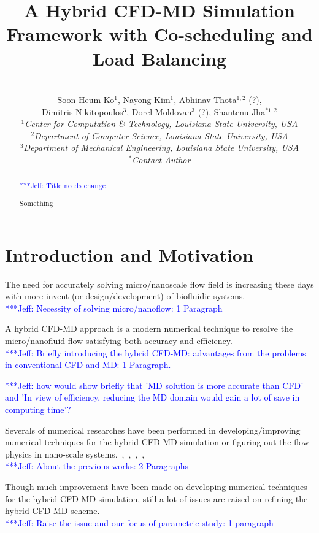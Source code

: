 \documentclass[conference,final]{IEEEtran}
\title{A Hybrid CFD-MD Simulation Framework with Co-scheduling and Load Balancing}
\author{
 ~\\[-2em]
 Soon-Heum Ko$^{1}$, Nayong Kim$^{1}$, Abhinav Thota$^{1,2}$ (?), \\
 Dimitris Nikitopoulos$^{3}$, Dorel Moldovan$^{3}$ (?), Shantenu Jha$^{*1,2}$\\
 \small{\emph{$^{1}$Center for Computation \& Technology, Louisiana State University, USA}}\\
 \small{\emph{$^{2}$Department of Computer Science, Louisiana State University, USA}}\\
 \small{\emph{$^{3}$Department of Mechanical Engineering, Louisiana State University, USA}}\\
 \small{\emph{$^{*}$Contact Author}}\\
}
\newcommand{\skonote}[1]{ {\textcolor{blue} { ***Jeff: #1 }}}
\newcommand{\skonote}[1]{}
\newcommand{\up}{\vspace*{-1em}}
\begin{document}
\maketitle

\begin{abstract}

\skonote{Title needs change}

 Something
\end{abstract}
\up\up


\section{Introduction and Motivation}


The need for accurately solving micro/nanoscale flow field is increasing these days with more invent (or design/development) of biofluidic systems.\\
\skonote{Necessity of solving micro/nanoflow: 1 Paragraph}
\newline
\newline


A hybrid CFD-MD approach is a modern numerical technique to resolve the micro/nanofluid flow satisfying both accuracy and efficiency.\\
\skonote{Briefly introducing the hybrid CFD-MD: advantages from the problems in conventional CFD and MD: 1 Paragraph.}
\newline
\newline


\skonote{how would show briefly that 'MD solution is more accurate than CFD' and 'In view of efficiency, reducing the MD domain would gain a lot of save in computing time'?}
\newline
\newline


Severals of numerical researches have been performed in developing/improving numerical techniques for the hybrid CFD-MD simulation or figuring out the flow physics in nano-scale systems.~\cite{Thompson},~\cite{Nie},~\cite{Yen},~\cite{Steijl},~\cite{Kotsalis}\\
\skonote{About the previous works: 2 Paragraphs}
\newline
\newline


Though much improvement have been made on developing numerical techniques for the hybrid CFD-MD simulation, still a lot of issues are raised on refining the hybrid CFD-MD scheme.\\
\skonote{Raise the issue and our focus of parametric study: 1 paragraph}
\newline
\newline
\end{document}
